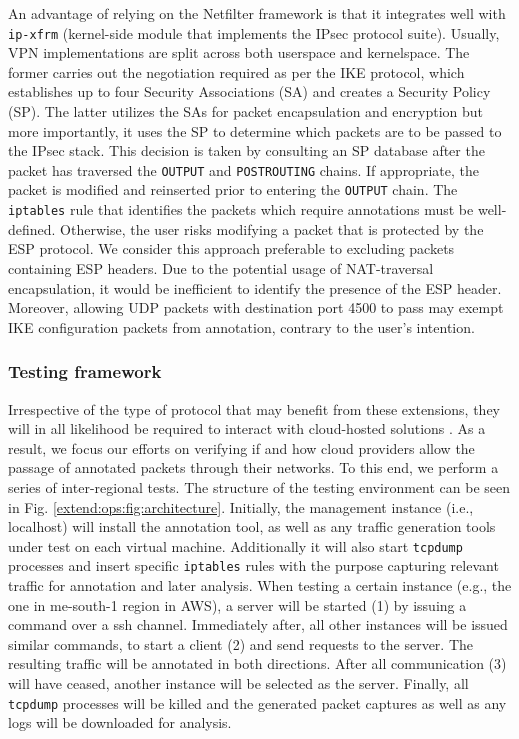 An advantage of relying on the Netfilter framework is that it integrates well with \texttt{ip-xfrm} (kernel-side module that implements the IPsec protocol suite). Usually, VPN implementations are split across both userspace and kernelspace. The former carries out the negotiation required as per the IKE protocol, which establishes up to four Security Associations (SA) and creates a Security Policy (SP). The latter utilizes the SAs for packet encapsulation and encryption but more importantly, it uses the SP to determine which packets are to be passed to the IPsec stack. This decision is taken by consulting an SP database after the packet has traversed the \texttt{OUTPUT} and \texttt{POSTROUTING} chains. If appropriate, the packet is modified and reinserted prior to entering the \texttt{OUTPUT} chain. The \texttt{iptables} rule that identifies the packets which require annotations must be well-defined. Otherwise, the user risks modifying a packet that is protected by the ESP protocol. We consider this approach preferable to excluding packets containing ESP headers. Due to the potential usage of NAT-traversal encapsulation, it would be inefficient to identify the presence of the ESP header. Moreover, allowing UDP packets with destination port 4500 to pass may exempt IKE configuration packets from annotation, contrary to the user's intention.

\subsubsection{Testing framework}
\label{extend:ops:architecture:cloud}

Irrespective of the type of protocol that may benefit from these extensions, they will in all likelihood be required to interact with cloud-hosted solutions \cite{daielephant}. As a result, we focus our efforts on verifying if and how cloud providers allow the passage of annotated packets through their networks. To this end, we perform a series of inter-regional tests. The structure of the testing environment can be seen in Fig. \ref{extend:ops:fig:architecture}. Initially, the management instance (i.e., localhost) will install the annotation tool, as well as any traffic generation tools under test on each virtual machine. Additionally it will also start \texttt{tcpdump} processes and insert specific \texttt{iptables} rules with the purpose capturing relevant traffic for annotation and later analysis. When testing a certain instance (e.g., the one in me-south-1 region in AWS), a server will be started (1) by issuing a command over a ssh channel. Immediately after, all other instances will be issued similar commands, to start a client (2) and send requests to the server. The resulting traffic will be annotated in both directions. After all communication (3) will have ceased, another instance will be selected as the server. Finally, all \texttt{tcpdump} processes will be killed and the generated packet captures as well as any logs will be downloaded for analysis.

